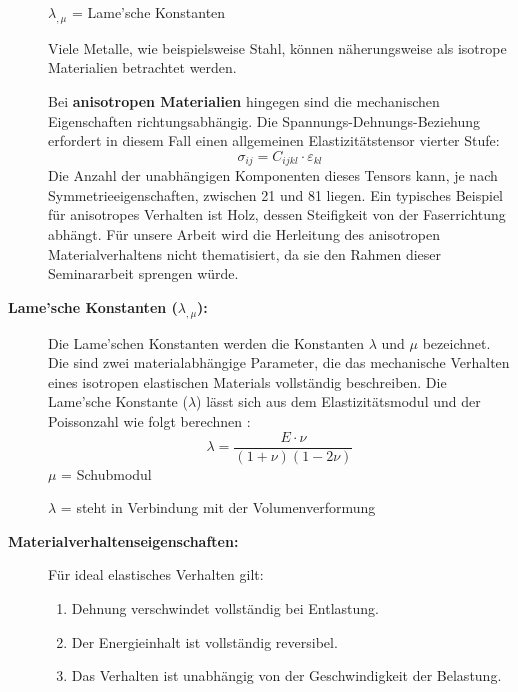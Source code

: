 \begin{description}
	 $\lambda_{,\mu}$ = Lame’sche Konstanten
	 
	 Viele Metalle, wie beispielsweise Stahl, können näherungsweise als isotrope Materialien betrachtet werden.
	 
	 \vspace{0.5em}
	 Bei \textbf{anisotropen Materialien} hingegen sind die mechanischen Eigenschaften richtungsabhängig. 
	 Die Spannungs-Dehnungs-Beziehung erfordert in diesem Fall einen allgemeinen Elastizitätstensor vierter Stufe:
		 \begin{equation}
	 		\sigma_{ij} = 
	 		C_{ijkl} \cdot \varepsilon_{kl}
		 \end{equation}
	 Die Anzahl der unabhängigen Komponenten dieses Tensors kann, je nach Symmetrieeigenschaften, zwischen 21 und 81 liegen. 
	 Ein typisches Beispiel für anisotropes Verhalten ist Holz, dessen Steifigkeit von der Faserrichtung abhängt.
	 Für unsere Arbeit wird die Herleitung des anisotropen Materialverhaltens nicht thematisiert, da sie den Rahmen dieser Seminararbeit sprengen würde.
	 
	 \item[\textbf{Lame’sche Konstanten ($\lambda_{,\mu}$):}] Die Lame'schen Konstanten werden die Konstanten $\lambda$ und $\mu$ bezeichnet. 
	 Die sind zwei materialabhängige Parameter, die das mechanische Verhalten eines isotropen elastischen Materials vollständig beschreiben.
	 Die Lame’sche Konstante ($\lambda$) lässt sich aus dem Elastizitätsmodul und der Poissonzahl wie folgt berechnen \cite{elastomechanik:Grundlagen der Elastizitaetstheorie}:
	 \begin{equation}
	 	\lambda = 
	 	\frac{E \cdot \nu}{(1 + \nu)(1 - 2\nu)}
	 \end{equation}
	 $\mu$ = Schubmodul
	 
	 $\lambda$ = steht in Verbindung mit der Volumenverformung
	 
	 \item[\textbf{Materialverhaltenseigenschaften:}] Für ideal elastisches Verhalten gilt:
	 \begin{enumerate}
	 	\item Dehnung verschwindet vollständig bei Entlastung.
	 	
	 	\item Der Energieinhalt ist vollständig reversibel.
	 	
	 	\item Das Verhalten ist unabhängig von der Geschwindigkeit der Belastung.
	 	

\end{enumerate}
\end{description}

